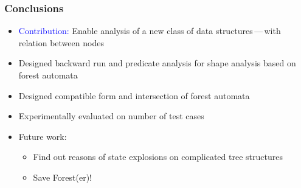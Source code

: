 \documentclass{beamer}
\newcommand{\hlbl}[1]{\textcolor{blue}{#1}}
\newcommand{\hlgr}[1]{\textcolor{olive!50!green}{#1}}
\begin{document}
\begin{frame}
\begin{center}
\begin{adjustbox}{max height=\textheight, max width=\textwidth}
\begin{tabular}{| l | l | r | r | r | r || l | l | r | r | r | r | r |}
        \hline
	\end{tabular}
	\label{tab:times}
	\end{adjustbox}	
	\end{center}

\end{frame}


\begin{frame}
  \frametitle{Conclusions}

  \begin{itemize}
	  \item \hlbl{Contribution:} Enable analysis of a new class of data structures\,---\,with relation
		  between nodes
		\item Designed backward run and predicate analysis for shape analysis based on forest automata 
		\item Designed compatible form and intersection of forest automata
		\item Experimentally evaluated on number of test cases
		\item \hlgr{Future work:}
			\begin{itemize}
				\item Find out reasons of state explosions on complicated tree structures
				\item Save Forest(er)!
			\end{itemize}
  \end{itemize}
\end{frame}
\end{document}
